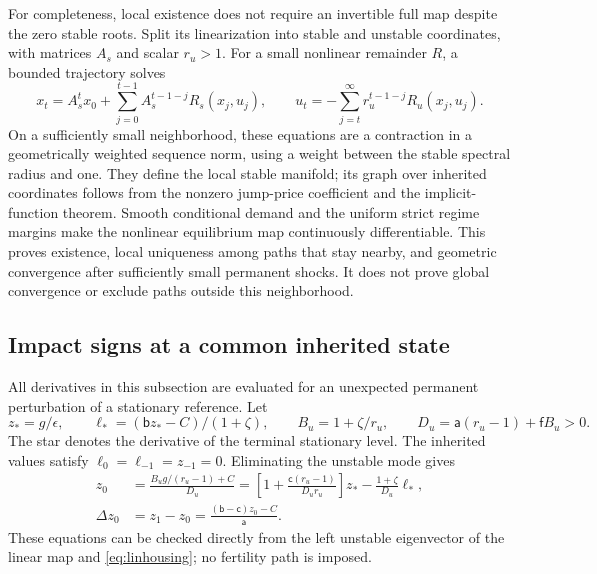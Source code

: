 \documentclass[11pt]{article}
\begin{document}
For completeness, local existence does not require an invertible full map despite the zero stable roots. Split its linearization into stable and unstable coordinates, with matrices $A_s$ and scalar $r_u>1$. For a small nonlinear remainder $R$, a bounded trajectory solves
\[
 x_t=A_s^t x_0+\sum_{j=0}^{t-1}A_s^{t-1-j}R_s(x_j,u_j),\qquad
 u_t=-\sum_{j=t}^{\infty}r_u^{t-1-j}R_u(x_j,u_j).
\]
On a sufficiently small neighborhood, these equations are a contraction in a geometrically weighted sequence norm, using a weight between the stable spectral radius and one. They define the local stable manifold; its graph over inherited coordinates follows from the nonzero jump-price coefficient and the implicit-function theorem. Smooth conditional demand and the uniform strict regime margins make the nonlinear equilibrium map continuously differentiable. This proves existence, local uniqueness among paths that stay nearby, and geometric convergence after sufficiently small permanent shocks. It does not prove global convergence or exclude paths outside this neighborhood.

\subsection{Impact signs at a common inherited state}
All derivatives in this subsection are evaluated for an unexpected permanent perturbation of a stationary reference. Let
\begin{equation}
 z_* =g/\epsilon,\qquad
 \ell_*=(\mathsf b z_*-C)/(1+\zeta),\qquad
 B_u=1+\zeta/r_u,\qquad
 D_u=\mathsf a(r_u-1)+\mathsf f B_u>0.\label{eq:impactobjects}
\end{equation}
The star denotes the derivative of the terminal stationary level. The inherited values satisfy $\ell_0=\ell_{-1}=z_{-1}=0$. Eliminating the unstable mode gives
\begin{align}
 z_0&=\frac{B_u g/(r_u-1)+C}{D_u}
 =\left[1+\frac{\mathsf c(r_u-1)}{D_u r_u}\right]z_*
       -\frac{1+\zeta}{D_u}\ell_*,\label{eq:impactprice}\\
 \Delta z_0&=z_1-z_0
       =\frac{(\mathsf b-\mathsf c)z_0-C}{\mathsf a}.\label{eq:impactrecovery}
\end{align}
These equations can be checked directly from the left unstable eigenvector of the linear map and \eqref{eq:linhousing}; no fertility path is imposed.
\end{document}
